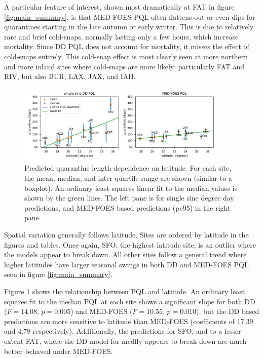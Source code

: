\documentclass[10pt,a4paper,twocolumn]{article}
\begin{document}
A particular feature of interest, shown most dramatically at FAT in figure \ref{fig:main_summary},
is that MED-FOES PQL often flattens out or even dips for quarantines starting in the late 
autumn or early winter.  This is due to relatively rare and brief cold-snaps,
normally lasting only a few hours, which increase mortality.
Since DD PQL does not account for mortality, it misses the effect of cold-snaps entirely.
This cold-snap effect is most clearly seen at more northern and 
more inland sites where cold-snaps are more likely: 
particularly FAT and RIV, but also BUR, LAX, JAX, and IAH.

\begin{figure}
\centering
\includegraphics[width=0.9\textwidth]{figs/fig_latitude_trend_withSFO.pdf}
\caption{\label{fig:latitude_trend} Predicted quarantine length dependence on latitude.
For each site, the mean, median, and inter-quartile range are shown (similar to a boxplot).
An ordinary least-squares linear fit to the median values is shown by the green lines.
The left pane is for single sine degree day predictions,
and MED-FOES based predictions (pe95) in the right pane.
}
\end{figure}

Spatial variation generally follows latitude.
Sites are ordered by latitude in the figures and tables.
Once again, SFO, the highest latitude site, is an outlier where the models appear to break down.
All other sites follow a general trend where higher latitudes have larger seasonal 
swings in both DD and MED-FOES PQL seen in figure \ref{fig:main_summary}.

Figure \ref{fig:latitude_trend} shows the relationship between PQL and latitude.
An ordinary least squares fit to the median PQL at each site shows a significant slope for
both DD ($F{=}14.08$, $p{=}0.005$) and MED-FOES ($F{=}10.55$, $p{=}0.010$), but
the DD based predictions are more sensitive to latitude than MED-FOES
(coefficients of 17.39 and 4.78 respectively).
Additionally, the predictions for SFO, and to a lesser extent FAT, where the DD model for medfly appears to
break down are much better behaved under MED-FOES.
\end{document}
